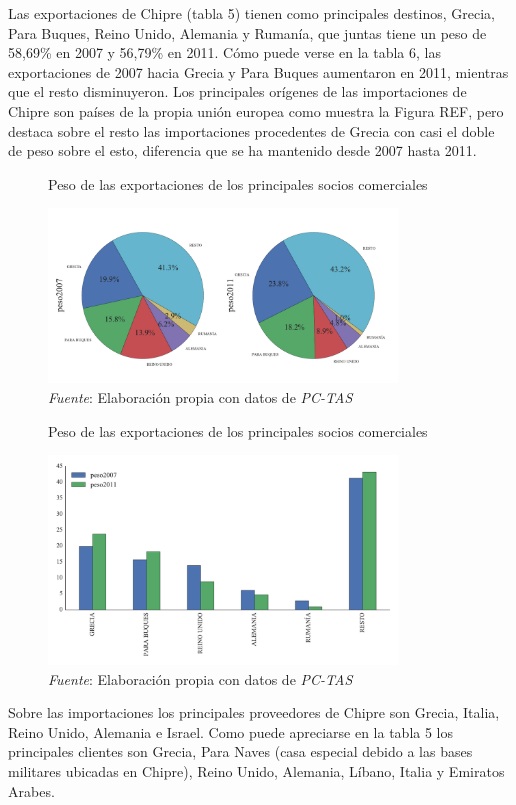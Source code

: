 \documentclass[a4paper,openright,12pt]{book}
\begin{document}
Las exportaciones de Chipre (tabla 5) tienen como principales destinos, Grecia, Para Buques, Reino Unido, Alemania y Rumanía, que juntas tiene un peso de 58,69\% en 2007 y 56,79\% en 2011. Cómo puede verse en la tabla 6, las exportaciones de 2007 hacia Grecia y Para Buques aumentaron en 2011, mientras que el resto disminuyeron.
Los principales orígenes de las importaciones de Chipre son países de la propia unión europea como muestra la Figura REF, pero destaca sobre el resto las importaciones procedentes de Grecia con casi el doble de peso sobre el esto, diferencia que se ha mantenido desde 2007 hasta 2011.


\begin{figure}[ht]
    \centering
    \caption{Peso de las exportaciones de los principales socios comerciales}
    \includegraphics[width=350px]{pie_xgeo.pdf}
    \caption*{\textit{Fuente}: Elaboración propia con datos de \textit{PC-TAS}}
    \label{pie_xgeo}
\end{figure}

\begin{figure}[tbh]
    \centering
    \caption{Peso de las exportaciones de los principales socios comerciales}
    \includegraphics[width=350px]{bar_xgeo.pdf}
    \caption*{\textit{Fuente}: Elaboración propia con datos de \textit{PC-TAS}}
    \label{bar_xgeo}
\end{figure}

Sobre las importaciones los principales proveedores de Chipre son Grecia, Italia, Reino Unido, Alemania e Israel. Como puede apreciarse en la tabla 5 los principales clientes son Grecia, Para Naves (casa especial debido a las bases militares ubicadas en Chipre), Reino Unido, Alemania, Líbano, Italia y Emiratos Arabes.
\end{document}
